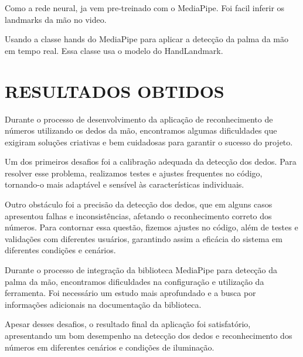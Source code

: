 \documentclass[12pt,a4paper]{article}
\begin{document}
        Como a rede neural, ja vem pre-treinado com o MediaPipe. Foi facil inferir os landmarks da mão no video.

        Usando a classe hands do MediaPipe para aplicar a detecção da palma da mão em tempo real. Essa classe usa o modelo do HandLandmark.


        

    \newpage

    \section{RESULTADOS OBTIDOS}
    
        Durante o processo de desenvolvimento da aplicação de reconhecimento de números utilizando os dedos da mão, encontramos algumas dificuldades que exigiram soluções criativas e bem cuidadosas para garantir o sucesso do projeto.

        Um dos primeiros desafios foi a calibração adequada da detecção dos dedos. Para resolver esse problema, realizamos testes e ajustes frequentes no código, tornando-o mais adaptável e sensível às características individuais.

        Outro obstáculo foi a precisão da detecção dos dedos, que em alguns casos apresentou falhas e inconsistências, afetando o reconhecimento correto dos números. Para contornar essa questão, fizemos ajustes no código, além de testes e validações com diferentes usuários, garantindo assim a eficácia do sistema em diferentes condições e cenários.

        Durante o processo de integração da biblioteca MediaPipe para detecção da palma da mão, encontramos dificuldades na configuração e utilização da ferramenta. Foi necessário um estudo mais aprofundado e a busca por informações adicionais na documentação da biblioteca.

        Apesar desses desafios, o resultado final da aplicação foi satisfatório, apresentando um bom desempenho na detecção dos dedos e reconhecimento dos números em diferentes cenários e condições de iluminação.
\end{document}
